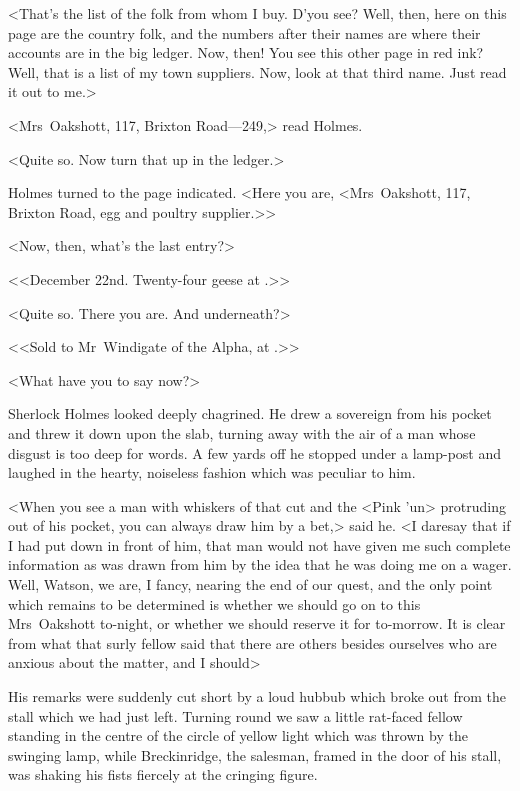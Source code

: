 <That's the list of the folk from whom I buy. D'you see? Well, then, here on this page are the country folk, and the numbers after their names are where their accounts are in the big ledger. Now, then! You see this other page in red ink? Well, that is a list of my town suppliers. Now, look at that third name. Just read it out to me.>

<Mrs~Oakshott, 117, Brixton Road—249,> read Holmes.

<Quite so. Now turn that up in the ledger.>

Holmes turned to the page indicated. <Here you are, <Mrs~Oakshott, 117, Brixton Road, egg and poultry supplier.>>

<Now, then, what's the last entry?>

<<December 22nd. Twenty-four geese at .>>

<Quite so. There you are. And underneath?>

<<Sold to Mr~Windigate of the Alpha, at .>>

<What have you to say now?>

Sherlock Holmes looked deeply chagrined. He drew a sovereign from his pocket and threw it down upon the slab, turning away with the air of a man whose disgust is too deep for words. A few yards off he stopped under a lamp-post and laughed in the hearty, noiseless fashion which was peculiar to him.

<When you see a man with whiskers of that cut and the <Pink 'un> protruding out of his pocket, you can always draw him by a bet,> said he. <I daresay that if I had put  down in front of him, that man would not have given me such complete information as was drawn from him by the idea that he was doing me on a wager. Well, Watson, we are, I fancy, nearing the end of our quest, and the only point which remains to be determined is whether we should go on to this Mrs~Oakshott to-night, or whether we should reserve it for to-morrow. It is clear from what that surly fellow said that there are others besides ourselves who are anxious about the matter, and I should\longdash>

His remarks were suddenly cut short by a loud hubbub which broke out from the stall which we had just left. Turning round we saw a little rat-faced fellow standing in the centre of the circle of yellow light which was thrown by the swinging lamp, while Breckinridge, the salesman, framed in the door of his stall, was shaking his fists fiercely at the cringing figure.

